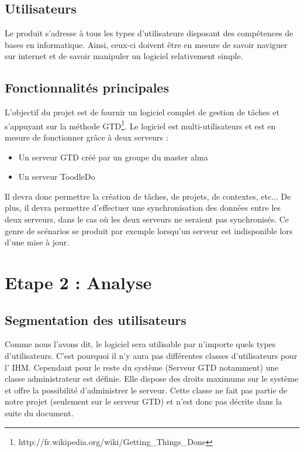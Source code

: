 \section{Utilisateurs}
Le produit s'adresse à tous les types d'utilisateurs disposant des compétences de bases en informatique. Ainsi, ceux-ci doivent être en mesure de savoir naviguer sur internet et de savoir manipuler un logiciel relativement simple. 

\section{Fonctionnalités principales}
L'objectif du projet est de fournir un logiciel complet de gestion de tâches et s'appuyant sur la méthode GTD\footnote{http://fr.wikipedia.org/wiki/Getting\_Things\_Done}. Le logiciel est multi-utilisateurs et est en mesure de fonctionner grâce à deux serveurs : \\
\begin{itemize}
 \item Un serveur GTD créé par un groupe du master alma
 \item Un serveur ToodleDo\\
\end{itemize}

Il devra donc permettre la création de tâches, de projets, de contextes, etc... De plus, il devra permettre d'effectuer une synchronisation des données entre les deux serveurs, dans le cas où les deux serveurs ne seraient pas synchronisés. Ce genre de scénarios se produit par exemple lorsqu'un serveur est indisponible lors d'une mise à jour.





\chapter{Etape 2 : Analyse}

\section{Segmentation des utilisateurs}
Comme nous l'avons dit, le logiciel sera utilisable par n'importe quels types d'utilisateurs. C'est pourquoi il n'y aura pas différentes classes d'utilisateurs pour l' IHM. Cependant pour le reste du système (Serveur GTD notamment) une classe administrateur est définie. Elle dispose des droits maximums sur le système et offre la possibilité d'administrer le serveur. Cette classe ne fait pas partie de notre projet (seulement sur le serveur GTD) et n'est donc pas décrite dans la suite du document.

